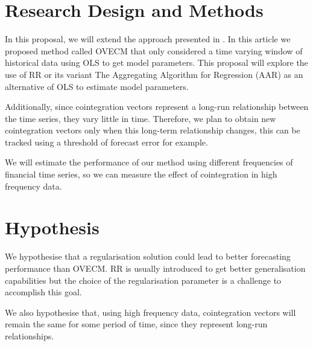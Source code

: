 \documentclass[12pt,reqno]{amsart}
\begin{document}
\section{Research Design and Methods}

In this proposal, we will extend the approach presented in \cite{icpram15}. In this article we proposed method called OVECM that only considered a time varying window of historical data using OLS to get model parameters. This proposal will explore the use of RR or its variant The  Aggregating Algorithm for Regression (AAR)  \cite{vovk2001} as an alternative of OLS to estimate model parameters.

Additionally, since cointegration vectors represent a long-run relationship between the time
series, they vary little in time. Therefore, we plan to obtain new
cointegration vectors only when this long-term relationship changes, this can be tracked using a threshold of forecast error for example.

We will estimate the performance of our method using different frequencies of financial time series, so we can measure the effect of cointegration in high frequency data.

\section{Hypothesis}

We hypothesise that a regularisation solution could lead to better forecasting performance than OVECM. RR is usually introduced to get better generalisation capabilities but the choice of the regularisation parameter is a challenge to accomplish this goal.

We also hypothesise that, using high frequency data, cointegration vectors will remain the same for some period of time, since they represent long-run relationships.





\end{document}
